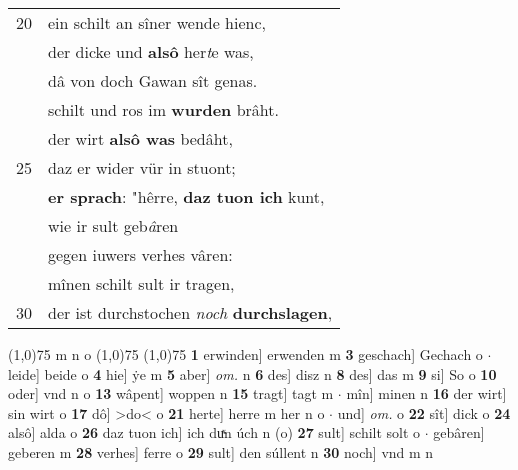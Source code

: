\documentclass[8pt,a4paper,notitlepage]{article}
\begin{document}
\begin{table}[ht]
\begin{minipage}[t]{0.5\linewidth}
\begin{tabular}{rl}
20 & ein schilt an sîner wende hienc,\\ 
 & der dicke und \textbf{alsô} her\textit{t}e was,\\ 
 & dâ von doch Gawan sît genas.\\ 
 & schilt und ros im \textbf{wurden} brâht.\\ 
 & der wirt \textbf{alsô was} bedâht,\\ 
25 & daz er wider vür in stuont;\\ 
 & \textbf{er sprach}: "hêrre, \textbf{daz tuon ich} kunt,\\ 
 & wie ir sult geb\textit{â}ren\\ 
 & gegen iuwers verhes vâren:\\ 
 & mînen schilt sult ir tragen,\\ 
30 & der ist durchstochen \textit{noch} \textbf{durchslagen},\\ 
\end{tabular}
\scriptsize
\line(1,0){75} \newline
m n o \newline
\line(1,0){75} \newline
\newline
\line(1,0){75} \newline
\textbf{1} erwinden] erwenden m \textbf{3} geschach] Gechach o  $\cdot$ leide] beide o \textbf{4} hie] ẏe m \textbf{5} aber] \textit{om.} n \textbf{6} des] disz n \textbf{8} des] das m \textbf{9} si] So o \textbf{10} oder] vnd n o \textbf{13} wâpent] woppen n \textbf{15} tragt] tagt m  $\cdot$ mîn] minen n \textbf{16} der wirt] sin wirt o \textbf{17} dô] >do< o \textbf{21} herte] herre m her n o  $\cdot$ und] \textit{om.} o \textbf{22} sît] dick o \textbf{24} alsô] alda o \textbf{26} daz tuon ich] ich duͯn úch n (o) \textbf{27} sult] schilt solt o  $\cdot$ gebâren] geberen m \textbf{28} verhes] ferre o \textbf{29} sult] den súllent n \textbf{30} noch] vnd m n \newline
\end{minipage}
\end{table}
\newpage
\end{document}
